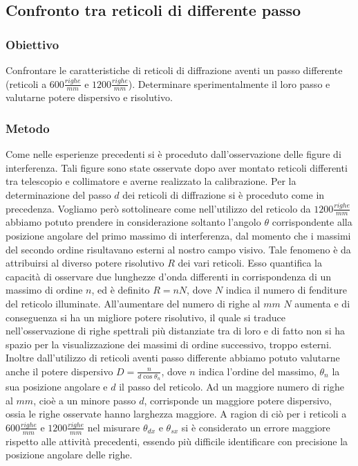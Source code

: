 \documentclass[a4paper]{article}
\begin{document}
\subsection{Confronto tra reticoli di differente passo}

\subsubsection{Obiettivo}
Confrontare le caratteristiche di reticoli di diffrazione aventi un passo differente (reticoli a $600 \frac{righe}{mm}$ e $1200 \frac{righe}{mm}$). Determinare sperimentalmente il loro passo e valutarne potere dispersivo e risolutivo.

\subsubsection{Metodo}
Come nelle esperienze precedenti si è proceduto dall'osservazione delle figure di interferenza. Tali figure sono state osservate dopo aver montato reticoli differenti tra telescopio e collimatore e averne realizzato la calibrazione. Per la determinazione del passo $d$ dei reticoli di diffrazione si è proceduto come in precedenza. Vogliamo però sottolineare come nell'utilizzo del reticolo da $1200 \frac{righe}{mm}$ abbiamo potuto prendere in considerazione soltanto l'angolo $\theta$ corrispondente alla posizione angolare del primo massimo di interferenza, dal momento che i massimi del secondo ordine risultavano esterni al nostro campo visivo. Tale fenomeno è da attribuirsi al diverso potere risolutivo $R$ dei vari reticoli. Esso quantifica la capacità di osservare due lunghezze d'onda differenti in corrispondenza di un massimo di ordine $n$, ed è definito $R=nN$, dove $N$ indica il numero di fenditure del reticolo illuminate. All'aumentare del numero di righe al $mm$ $N$ aumenta e di conseguenza si ha un migliore potere risolutivo, il quale si traduce nell'osservazione di righe spettrali più distanziate tra di loro e di fatto non si ha spazio per la visualizzazione dei massimi di ordine successivo, troppo esterni.
Inoltre dall'utilizzo di reticoli aventi passo differente abbiamo potuto valutarne anche il potere dispersivo $D=\frac{n}{d\cos{\theta_n}}$, dove $n$ indica l'ordine del massimo, $\theta_n$ la sua posizione angolare e $d$ il passo del reticolo. Ad un maggiore numero di righe al $mm$, cioè a un minore passo $d$, corrisponde un maggiore potere dispersivo, ossia le righe osservate hanno larghezza maggiore. A ragion di ciò per i reticoli a $600 \frac{righe}{mm}$ e $1200 \frac{righe}{mm}$ nel misurare $\theta_{dx}$ e $\theta_{sx}$ si è considerato un errore maggiore rispetto alle attività precedenti, essendo più difficile identificare con precisione la posizione angolare delle righe.
\end{document}
